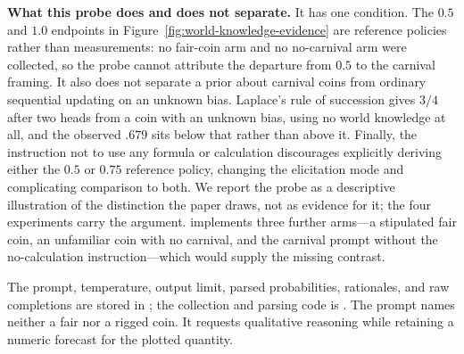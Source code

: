 \noindent\textbf{What this probe does and does not separate.}
It has one condition. The $0.5$ and $1.0$ endpoints in
Figure~\ref{fig:world-knowledge-evidence} are reference policies rather than
measurements: no fair-coin arm and no no-carnival arm were collected, so the
probe cannot attribute the departure from $0.5$ to the carnival framing. It also
does not separate a prior about carnival coins from ordinary sequential updating
on an unknown bias. Laplace's rule of succession gives $3/4$ after two heads from
a coin with an unknown bias, using no world knowledge at all, and the observed
$.679$ sits below that rather than above it. Finally, the instruction not to use
any formula or calculation discourages explicitly deriving either the $0.5$ or
$0.75$ reference policy, changing the elicitation mode and complicating comparison
to both. We report the probe as a descriptive
illustration of the distinction the paper draws, not as evidence for it; the
four experiments carry the argument.  implements
three further arms---a stipulated fair coin, an unfamiliar coin with no carnival,
and the carnival prompt without the no-calculation instruction---which would
supply the missing contrast.

The prompt, temperature, output limit, parsed probabilities, rationales, and raw
completions are stored in
;
the collection and parsing code is
. The prompt names
neither a fair nor a rigged coin. It requests qualitative reasoning while retaining
a numeric forecast for the plotted quantity.
